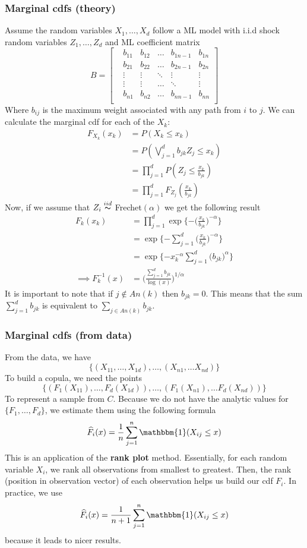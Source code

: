\documentclass[12pt]{article}
\def\inv{^{-1}}
\newcommand{\ds}{\displaystyle}
\theoremstyle{definition}
\theoremstyle{definition}
\begin{document}
\subsubsection{Marginal cdfs (theory)}
Assume the random variables $X_1,\hdots, X_d$ follow a ML model with i.i.d shock random variables $Z_1,\hdots, Z_d$ and ML coefficient matrix 
\[ B=\begin{bmatrix}
&b_{11} &b_{12}&\hdots& b_{1n-1}& b_{1n}\\
&b_{21} &b_{22}&\hdots& b_{2n-1}& b_{2n}\\
&\vdots&\vdots&\ddots & \vdots& \vdots \\
&\vdots&\vdots&\hdots & \ddots& \vdots \\
&b_{n1}& b_{n2} & \hdots &b_{nn-1}& b_{nn}\\
\end{bmatrix}
\]
Where $b_{ij}$ is the maximum weight associated with any path from $i$ to $j$. We can calculate the marginal cdf for each of the $X_k$:
\begin{align*}
    F_{X_k}(x_k)&=P(X_k\leq x_k)\\
    &=P(\bigvee_{j=1}^db_{jk}Z_j\leq x_k)\\
    &=\prod_{j=1}^dP(Z_j\leq \frac{x_k}{b_{jk}})\\
    &=\prod_{j=1}^dF_{Z_j}( \frac{x_k}{b_{jk}})
\end{align*}
Now, if we assume that $Z_i\overset{iid}{\thicksim}$ Frechet$(\alpha)$ we get the following result
\begin{align*}
    F_{k}(x_k)&=\prod_{j=1}^d\exp\bigg\{{-\big(\frac{x_k}{b_{jk}}}\big)^{-\alpha}\bigg\}\\
    &=\exp\bigg\{{-\sum_{j=1}^d\big(\frac{x_k}{b_{jk}}}\big)^{-\alpha}\bigg\}\\
    &=\exp\bigg\{{-x_k^{-\alpha}\sum_{j=1}^d\big({b_{jk}}}\big)^{\alpha}\bigg\}\\
    \implies F_{k}\inv(x)&=\bigg(\frac{\sum_{j=1}^d{b_{jk}}}{\log(x)} \bigg)^{{1}/{\alpha}}
\end{align*}
It is important to note that if $j\notin An(k)$ then $b_{jk}=0$. This means that the sum $\ds \sum_{j=1}^d{b_{jk}}$ is equivalent to $\ds \sum_{j\in An(k)}{b_{jk}}$.
\subsubsection{Marginal cdfs (from data)}
From the data, we have $$\{(X_{11},\hdots,X_{1d}), \hdots, (X_{n1}, \hdots X_{nd})\}$$To build a copula, we need the points 
$$\{(F_1(X_{11}),\hdots,F_d(X_{1d})), \hdots, (F_1(X_{n1}), \hdots F_d(X_{nd}))\}$$
To represent a sample from $C$. Because we do not have the analytic values for $\{F_1,\hdots,F_d\}$, we estimate them using the following formula
$$\widehat{F}_i(x)=\frac{1}{n}\sum_{j=1}^n\mathbbm{1}(X_{ij}\leq x)$$
This is an application of the \textbf{rank plot} method. Essentially, for each random variable $X_{i}$, we rank all observations from smallest to greatest. Then, the rank (position in observation vector) of each observation helps us build our cdf $F_i$. In practice, we use 
$$\widehat{F}_i(x)=\frac{1}{n+1}\sum_{j=1}^n\mathbbm{1}(X_{ij}\leq x)$$
because it leads to nicer results.
\end{document}
